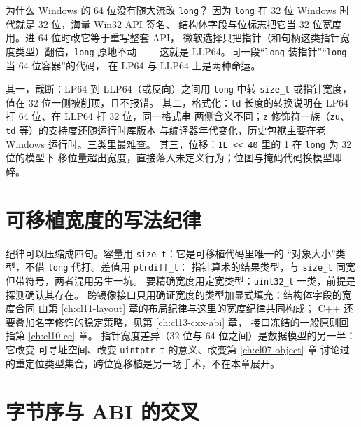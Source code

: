 \documentclass[12pt,a4paper,fontset=fandol]{ctexbook}
\newcommand{\Tp}[1]{\texttt{#1}}
\newcommand{\Lang}[1]{\textsf{#1}}
\newcommand{\CPP}{\Lang{C++}}
\newcommand{\Win}{\textsf{Windows}}
\begin{document}
为什么 \Win{} 的 64 位没有随大流改 \Tp{long}？
因为 \Tp{long} 在 32 位 \Win{} 时代就是 32 位，海量 Win32 API 签名、
结构体字段与位标志把它当 32 位宽度用。进 64 位时改它等于重写整套 API，
微软选择只把指针（和句柄这类指针宽度类型）翻倍，\Tp{long} 原地不动——
这就是 LLP64。同一段“\Tp{long} 装指针”“\Tp{long} 当 64 位容器”的代码，
在 LP64 与 LLP64 上是两种命运。

\begin{warning}[title={long 与 size\_t 混用的三类故障}]
其一，截断：LP64 到 LLP64（或反向）之间用 \Tp{long} 中转 \Tp{size\_t}
或指针宽度，值在 32 位一侧被削顶，且不报错。
其二，格式化：\Tp{ld} 长度的转换说明在 LP64 打 64 位、在 LLP64 打 32 位，同一格式串
两侧含义不同；\Tp{z} 修饰符一族（\Tp{zu}、\Tp{td} 等）的支持度还随运行时库版本
与编译器年代变化，历史包袱主要在老 \Win{} 运行时。三类里最难查。
其三，位移：\Tp{1L << 40} 里的 1 在 \Tp{long} 为 32 位的模型下
移位量超出宽度，直接落入未定义行为；位图与掩码代码换模型即碎。
\end{warning}

\section{可移植宽度的写法纪律}\label{sec:cl12-width-discipline}

纪律可以压缩成四句。容量用 \Tp{size\_t}：它是可移植代码里唯一的
“对象大小”类型，不借 \Tp{long} 代打。差值用 \Tp{ptrdiff\_t}：
指针算术的结果类型，与 \Tp{size\_t} 同宽但带符号，两者混用另生一坑。
要精确宽度用定宽类型：\Tp{uint32\_t} 一类，前提是探测确认其存在。
跨镜像接口只用确证宽度的类型加显式填充：结构体字段的宽度合同
由第 \ref{ch:cl11-layout} 章的布局纪律与这里的宽度纪律共同构成；
\CPP{} 还要叠加名字修饰的稳定策略，见第 \ref{ch:cl13-cxx-abi} 章，
接口冻结的一般原则回指第 \ref{ch:cl10-cc} 章。
指针宽度差异（32 位与 64 位之间）是数据模型的另一半：它改变
可寻址空间、改变 \Tp{uintptr\_t} 的意义、改变第 \ref{ch:cl07-object} 章
讨论过的重定位类型集合，跨位宽移植是另一场手术，不在本章展开。

\section{字节序与 ABI 的交叉}\label{sec:cl12-endian-abi}
\end{document}
